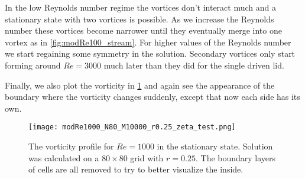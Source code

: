 \documentclass[10pt,a4paper,twocolumn]{article}
\begin{document}
In the low Reynolds number regime the vortices don't interact much and a stationary state with two vortices is possible. As we increase the Reynolds number these vortices become narrower until they eventually merge into one vortex as in \cref{fig:modRe100_stream}. For higher values of the Reynolds number we start regaining some symmetry in the solution. Secondary vortices only start forming around $Re=3000$ much later than they did for the single driven lid.

Finally, we also plot the vorticity in \cref{fig:modRe1000_zeta} and again see the appearance of the boundary where the vorticity changes suddenly, except that now each side has its own.

\begin{figure}[!h]
    \centering
    \texttt{[image: modRe1000\_N80\_M10000\_r0.25\_zeta\_test.png]}
    \caption{The vorticity profile for $Re=1000$ in the stationary state. Solution was calculated on a $80 \times 80$ grid with $r=0.25$. The boundary layers of cells are all removed to try to better visualize the inside.}
    \label{fig:modRe1000_zeta}
\end{figure}

\printbibliography
\end{document}
